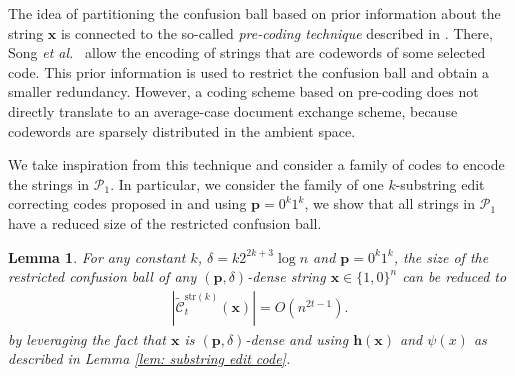 \documentclass[onecolumn]{IEEEtran}
\newtheorem{lemma}{Lemma}
\newcommand{\bl}{n}
\newcommand{\numedits}{t}
\newcommand{\editsize}{k}
\newcommand{\resconfball}[3]{\tilde{\mathcal{C}}_{#1}^{#2}(#3)}
\newcommand{\bfp}{{\mathbf{ p}}}
\newcommand{\bfx}{{\mathbf{ x}}}
\newcommand{\cP}{\mathcal{P}}
\newcommand{\vr}[1]{{\color{red} {\small [VR: #1]} }}
\begin{document}
The idea of partitioning the confusion ball based on prior information about the string $\bfx$ is connected to the so-called \emph{pre-coding technique} described in \cite{Song_Systematic_mult_del_sub_(precoding)}. There, Song \emph{et al.}~\cite{Song_Systematic_mult_del_sub_(precoding)} allow the encoding of strings that are codewords of some selected code. This prior information is used to restrict the confusion ball and obtain a smaller redundancy. However, a coding scheme based on pre-coding does not directly translate to an average-case document exchange scheme, because codewords are sparsely distributed in the ambient space. 

We take inspiration from this technique and consider a family of codes to encode the strings in $\cP_1$. In particular, we consider the family of one $\editsize$-substring edit correcting codes proposed in \cite{Li_Optimal_one_substring_error} and using $\bfp = 0^\editsize1^\editsize$, we show that all strings in $\cP_1$ have a reduced size of the restricted confusion ball.

\begin{lemma}
    \label{lem: reduction of confusable ball size}
    For any constant $\editsize$, $\delta = \editsize2^{2\editsize+3}\log\bl$ and $\bfp=0^\editsize1^\editsize$, the size of the restricted confusion ball of any $(\mathbf{p}, \delta)$-dense string $\mathbf{x} \in \{1,0\}^\bl$ can be reduced to
    \begin{align*}
        |\resconfball{\numedits}{\mathrm{str}(\editsize)}{\mathbf{x}}| = O(\bl^{2\numedits-1}).
    \end{align*}  
    by leveraging the fact that $\bfx$ is $(\bfp,\delta)$-dense and using $\mathbf{h(\mathbf{x})}$ and $\psi(x)$ as described in Lemma \ref{lem: substring edit code}.
\end{lemma}
\end{document}
